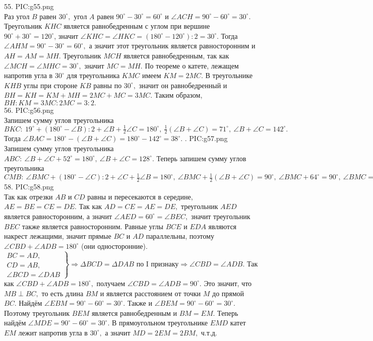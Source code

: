 55. {{PIC:g55.png}}\\
Раз угол $B$ равен $30^\circ,$ угол $A$ равен $90^\circ-30^\circ=60^\circ$ и $\angle ACH=90^\circ-60^\circ=30^\circ.$  Треугольник $KHC$ является равнобедренным с углом при вершине $90^\circ+30^\circ=120^\circ$, значит $\angle KHC=\angle HKC=(180^\circ-120^\circ):2=30^\circ.$ Тогда $\angle AHM=90^\circ-30^\circ=60^\circ,$ а значит этот треугольник является равносторонним и $AH=AM=MH.$ Треугольник $MCH$ является равнобедренным, так как $\angle MCH=\angle MHC=30^\circ,$ значит $MC=MH.$  По теореме о катете, лежащем напротив угла в $30^\circ$ для треугольника $KMC$ имеем $KM=2MC.$ В треугольнике $KHB$ углы при стороне $KB$ равны по $30^\circ,$ значит он равнобедренный и  $BH=KH=KM+MH=2MC+MC=3MC.$ Таким образом, $BH:KM=3MC:2MC=3:2.$\\
56. {{PIC:g56.png}}\\
Запишем сумму углов треугольника $BKC:\ 19^\circ+(180^\circ-\angle B):2+\angle B+\frac{1}{2}\angle C=180^\circ,\ \frac{1}{2}(\angle B+\angle C)=71^\circ,\ \angle B+\angle C=142^\circ.$ Тогда $\angle BAC=180^\circ-(\angle B+\angle C)=180^\circ-142^\circ=38^\circ.$\newpage
{}. {{PIC:g57.png}}\\
Запишем сумму углов треугольника $ABC:\ \angle B+\angle C+52^\circ=180^\circ,\ \angle B+\angle C=128^\circ.$ Теперь запишем сумму углов треугольника $CMB:\ \angle BMC+(180^\circ-\angle C):2+\angle C+\frac{1}{2}\angle B=180^\circ,\ \angle BMC+\frac{1}{2}(\angle B+\angle C)=90^\circ,\ \angle BMC+64^\circ=90^\circ,\ \angle BMC=26^\circ.$\\
58. {{PIC:g58.png}}\\
Так как отрезки $AB$ и $CD$ равны и пересекаются в середине, $AE=BE=CE=DE.$ Так как $AD=CE=AE=DE,$ треугольник $AED$ является равносторонним, а значит $\angle AED=60^\circ=\angle BEC,$ значит треугольник $BEC$ также является равносторонним. Равные углы $BCE$ и $EDA$ являются накрест лежащими, значит прямые $BC$ и $AD$ параллельны, поэтому $\angle CBD+\angle ADB=180^\circ$ (они односторонние). $\left.\begin{array}{l}BC=AD,\\
CD=AB,\\
\angle BCD=\angle DAB  \end{array}\right\}\Rightarrow \Delta BCD=\Delta DAB\text{ по I признаку}\Rightarrow \angle CBD=\angle ADB.$ Так как $\angle CBD+\angle ADB=180^\circ,$ получаем $\angle CBD=\angle ADB=90^\circ.$ Это значит, что $MB\perp BC,$ то есть длина $BM$ и является расстоянием от точки $M$ до прямой $BC.$ Найдём $\angle EBM=90^\circ-60^\circ=30^\circ.$ Также и $\angle BEM=90^\circ-60^\circ=30^\circ.$ Поэтому треугольник $BEM$ является равнобедренным и $BM=EM.$ Теперь найдём $\angle MDE=90^\circ-60^\circ=30^\circ.$ В прямоугольном треугольнике $EMD$ катет $EM$ лежит напротив угла в $30^\circ,$ а значит $MD=2EM=2BM,$ ч.т.д.\\
